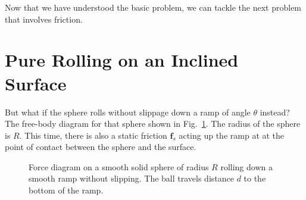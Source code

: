 \documentclass[11pt]{article}
\newcommand{\mb}[1]{\mathbf{#1}}
\begin{document}
Now that we have understood the basic problem, we can tackle the next problem
that involves friction.

\section{Pure Rolling on an Inclined Surface}
But what if the sphere rolls without slippage down a ramp of angle $\theta$
instead? The free-body diagram for that sphere shown in Fig.~\ref{roll-ramp}.
The radius of the sphere is $R$. This time, there is also a static friction
$\mb{f}_s$ acting up the ramp at at the point of contact between the sphere and
the surface.
\begin{figure}[!ht]
  \centering
  \caption{Force diagram on a smooth solid sphere of radius $R$ rolling down a
    smooth ramp without slipping. The ball travels distance $d$ to the bottom
    of the ramp.}
  \label{roll-ramp}
\end{figure}
\end{document}
